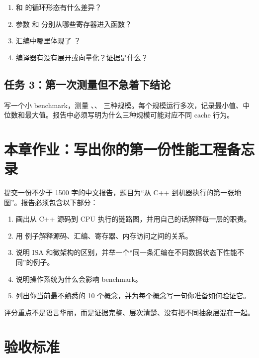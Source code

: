 \begin{labbox}
\begin{enumerate}
  \item {} 和  的循环形态有什么差异？
  \item 参数  和  分别从哪些寄存器进入函数？
  \item 汇编中哪里体现了 ？
  \item 编译器有没有展开或向量化？证据是什么？
\end{enumerate}

\subsection*{任务 3：第一次测量但不急着下结论}

写一个小 benchmark，测量 、、 三种规模。每个规模运行多次，记录最小值、中位数和最大值。报告中必须写明为什么三种规模可能对应不同 cache 行为。
\end{labbox}

\section{本章作业：写出你的第一份性能工程备忘录}

\begin{exercisebox}
提交一份不少于 1500 字的中文报告，题目为“从 C++ 到机器执行的第一张地图”。报告必须包含以下部分：

\begin{enumerate}
  \item 画出从 C++ 源码到 CPU 执行的链路图，并用自己的话解释每一层的职责。
  \item 用  例子解释源码、汇编、寄存器、内存访问之间的关系。
  \item 说明 ISA 和微架构的区别，并举一个“同一条汇编在不同数据状态下性能不同”的例子。
  \item 说明操作系统为什么会影响 benchmark。
  \item 列出你当前最不熟悉的 10 个概念，并为每个概念写一句你准备如何验证它。
\end{enumerate}

评分重点不是语言华丽，而是证据完整、层次清楚、没有把不同抽象层混在一起。
\end{exercisebox}

\section{验收标准}


